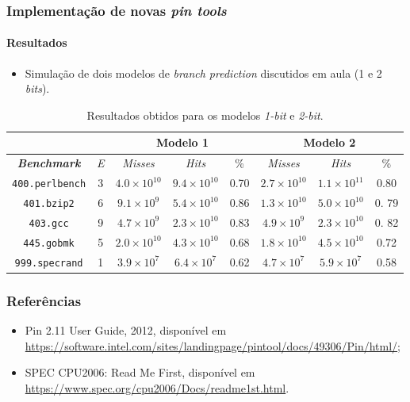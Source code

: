 \documentclass[10pt]{beamer}
\begin{document}
\begin{frame}
\frametitle{Implementação de novas \textit{pin tools}}
\framesubtitle{Resultados}

\begin{itemize}

    \item Simulação de dois modelos de \textit{branch prediction} discutidos em
    aula (1 e 2 \textit{bits}).
  \end{itemize}
  
{\scriptsize 
  \begin{table}[h]
\centering
\caption{\label{tab:modelos} Resultados obtidos para os modelos \textit{1-bit}
e \textit{2-bit}.}
\begin{tabular}{| c | c | c | c | c | c | c | c |}

\hline
\multicolumn{2}{|c|}{} & \multicolumn{3}{c|}{\textbf{Modelo 1}} &
\multicolumn{3}{|c|}{\textbf{Modelo 2}}	\\ 	\hline
\textit{\textbf{Benchmark}} & \textit{E}  & \textit{Misses} & \textit{Hits} &
\% & \textit{Misses} & \textit{Hits} & \% \\
\hline \hline \texttt{400.perlbench} & 3 & \(4.0\times10^{10}\) &
\(9.4\times10^{10}\) & 0.70 & \(2.7\times10^{10}\) & \(1.1\times10^{11}\)
& 0.80 \\
\hline \texttt{401.bzip2} & 6 & \(9.1\times10^{9}\) & \(5.4\times10^{10}\) &
0.86 & \(1.3\times10^{10}\) & \(5.0\times10^{10}\) & 0. 79 \\ \hline
\texttt{403.gcc} & 9 & \(4.7\times10^{9}\) & \(2.3\times10^{10}\) &
0.83 & \(4.9\times10^{9}\) & \(2.3\times10^{10}\) & 0. 82 \\ \hline
\texttt{445.gobmk} & 5 & \(2.0\times10^{10}\) & \(4.3\times10^{10}\)  & 0.68 &
\(1.8\times10^{10}\) & \(4.5\times10^{10}\) & 0.72 \\ \hline
\texttt{999.specrand} & 1 & \(3.9\times10^{7}\) & \(6.4\times10^{7}\) & 0.62 &
\(4.7\times10^{7}\) & \(5.9\times10^{7}\) & 0.58\\ \hline
\end{tabular}
\end{table}

}
\end{frame}

\begin{frame}
\frametitle{Referências}

\begin{itemize}
  \item Pin 2.11 User Guide, 2012, disponível em
  \url{https://software.intel.com/sites/landingpage/pintool/docs/49306/Pin/html/};
  \vspace{14pt}
  \item SPEC CPU2006: Read Me First, disponível em
  \url{https://www.spec.org/cpu2006/Docs/readme1st.html}.
\end{itemize}

\end{frame}
\end{document}
